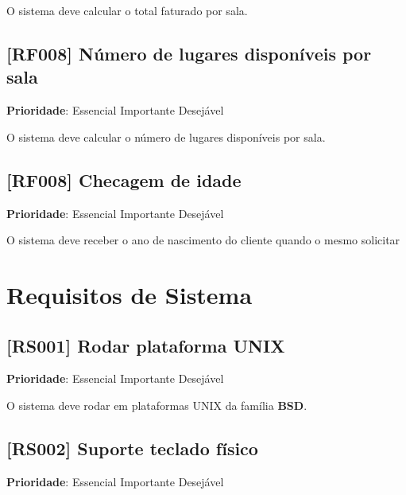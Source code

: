 \documentclass[12pt,a4paper]{article}
\let\oldsection\section
\renewcommand\section{\clearpage\oldsection}
\begin{document}
O sistema deve calcular o total faturado por sala.

\subsection{[RF008] Número de lugares disponíveis por sala}

\textbf{Prioridade}:
\mbox{\ooalign{$\checkmark$\cr\hidewidth$\square$\hidewidth\cr}} Essencial
\mbox{\ooalign{\cr\hidewidth$\square$\hidewidth\cr}} Importante
\mbox{\ooalign{\cr\hidewidth$\square$\hidewidth\cr}} Desejável

O sistema deve calcular o número de lugares disponíveis por sala.

\subsection{[RF008] Checagem de idade}

\textbf{Prioridade}:
\mbox{\ooalign{$\checkmark$\cr\hidewidth$\square$\hidewidth\cr}} Essencial
\mbox{\ooalign{\cr\hidewidth$\square$\hidewidth\cr}} Importante
\mbox{\ooalign{\cr\hidewidth$\square$\hidewidth\cr}} Desejável

O sistema deve receber o ano de nascimento do cliente quando o mesmo
solicitar 

\section{Requisitos de Sistema}

\subsection{[RS001] Rodar plataforma UNIX}

\textbf{Prioridade}:
\mbox{\ooalign{\cr\hidewidth$\square$\hidewidth\cr}} Essencial
\mbox{\ooalign{$\checkmark$\cr\hidewidth$\square$\hidewidth\cr}} Importante
\mbox{\ooalign{\cr\hidewidth$\square$\hidewidth\cr}} Desejável

O sistema deve rodar em plataformas UNIX da família \textbf{BSD}.

\subsection{[RS002] Suporte teclado físico}

\textbf{Prioridade}:
\mbox{\ooalign{$\checkmark$\cr\hidewidth$\square$\hidewidth\cr}} Essencial
\mbox{\ooalign{\cr\hidewidth$\square$\hidewidth\cr}} Importante
\mbox{\ooalign{\cr\hidewidth$\square$\hidewidth\cr}} Desejável
\end{document}

